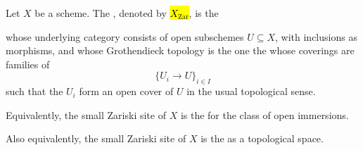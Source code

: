 \begin{definition} \label{definition:small_zariski_site_of_a_schem}
    Let $X$ be a scheme. The , denoted by \hl{$X_{\mathrm{Zar}}$}, is the  
    
    whose underlying category consists of open subschemes $U \subseteq X$, with inclusions as morphisms,
    and whose Grothendieck topology is the one  the  whose coverings are families of 
    $$ \{ U_i \to U \}_{i \in I} $$
    such that the $U_i$ form an open cover of $U$ in the usual topological sense. 

    Equivalently, the small Zariski site of $X$ is the  for the class of open immersions. 

    Also equivalently, the small Zariski site of $X$ is the  as a topological space.
\end{definition}